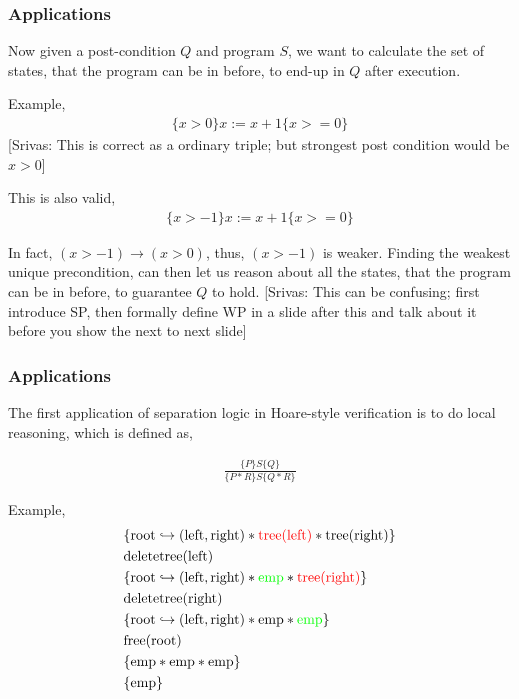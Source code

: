 \documentclass{beamer}
\newcommand{\mscmt}[1]{{\color{blue} [Srivas: {#1}]}}
\begin{document}
\begin{frame}
\frametitle{Applications}
Now given a post-condition $Q$ and program $S$, we want to calculate the set
of states, that the program can be in before, to end-up in $Q$ after execution.

Example,
\begin{align*}
    \{x > 0\}x := x + 1\{x >= 0\}
\end{align*}
\mscmt{\tiny{This is correct as a ordinary triple; but strongest post condition would be $x > 0$}}

This is also valid,
\begin{align*}
    \{x > -1\}x := x + 1\{x >= 0\}
\end{align*}

In fact, $(x > -1) \to (x > 0)$, thus, $(x > -1)$ is weaker. Finding the
weakest unique precondition, can then let us reason about all the states,
that the program can be in before, to guarantee $Q$ to hold.
\mscmt{\tiny{This can be confusing; first introduce SP, then formally define WP in a slide after this and talk about it before you show the next to next slide}}
\end{frame}

\begin{frame}
\frametitle{Applications}
The first application of separation logic in Hoare-style verification is
to do local reasoning, which is defined as,

\begin{align*}
    \frac{\{P\} S \{Q\}}{\{P * R\} S \{Q * R\}}
\end{align*}

Example,
\begin{align*}
    & \{\textrm{root} \hookrightarrow (\textrm{left}, \textrm{right}) * \textcolor{red}{\textrm{tree(left)}} * \textrm{tree(right)}\} \\
    & \textrm{deletetree(left)} \\
    & \{\textrm{root} \hookrightarrow (\textrm{left}, \textrm{right}) * \textcolor{green}{\textrm{emp}} * \textcolor{red}{\textrm{tree(right)}}\} \\
    & \textrm{deletetree(right)} \\
    & \{\textrm{root} \hookrightarrow (\textrm{left}, \textrm{right}) * \textrm{emp} * \textcolor{green}{\textrm{emp}}\} \\
    & \textrm{free(root)} \\
    & \{\textrm{emp} * \textrm{emp} * \textrm{emp}\} \\
    & \{\textrm{emp}\}
\end{align*}
\end{frame}
\end{document}
